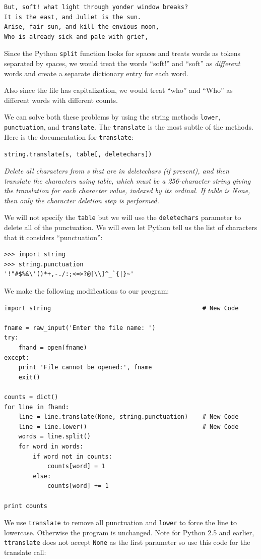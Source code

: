 \documentclass[10pt]{book}
\begin{document}
\beforeverb
\begin{verbatim}
But, soft! what light through yonder window breaks?
It is the east, and Juliet is the sun.
Arise, fair sun, and kill the envious moon,
Who is already sick and pale with grief,
\end{verbatim}
\afterverb
%
Since the Python {\tt split} function looks for spaces and
treats words as tokens separated by spaces, we would treat the
words ``soft!'' and ``soft'' as {\em different} words and create
a separate dictionary entry for each word.

Also since the file has capitalization, we would treat
``who'' and ``Who'' as different words with different 
counts.

We can solve both these problems by using the string
methods {\tt lower}, {\tt punctuation}, and {\tt translate}.  The 
{\tt translate} is the most subtle of the methods.  
Here is the documentation for {\tt translate}:

\verb"string.translate(s, table[, deletechars])"

{\em Delete all characters from s that are in deletechars (if present), 
and then translate the characters using table, which must 
be a 256-character string giving the translation for each 
character value, indexed by its ordinal. If table is None, 
then only the character deletion step is performed.}

We will not specify the {\tt table} but we will use 
the {\tt deletechars} parameter to delete all of the punctuation.
We will even let Python tell us the list of characters
that it considers ``punctuation'':

\beforeverb
\begin{verbatim}
>>> import string
>>> string.punctuation
'!"#$%&\'()*+,-./:;<=>?@[\\]^_`{|}~'
\end{verbatim}
\afterverb
%
We make the following modifications to our program:

\beforeverb
\begin{verbatim}
import string                                          # New Code

fname = raw_input('Enter the file name: ')
try:
    fhand = open(fname)
except:
    print 'File cannot be opened:', fname
    exit()

counts = dict()
for line in fhand:
    line = line.translate(None, string.punctuation)    # New Code
    line = line.lower()                                # New Code
    words = line.split()
    for word in words:
        if word not in counts:
            counts[word] = 1
        else:
            counts[word] += 1

print counts
\end{verbatim}
\afterverb
%
We use {\tt translate} to remove all punctuation and {\tt lower} to 
force the line to lowercase.  Otherwise the program is unchanged.
Note for Python 2.5 and earlier, {\tt ttranslate} does not 
accept {\tt None} as the first parameter so use this code for the translate 
call:
\end{document}
